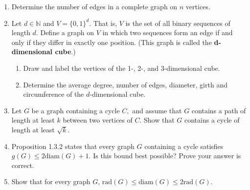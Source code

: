 \documentclass[12pt]{article}
\renewcommand{\emph}[1]{\textsf{\textbf{#1}}}
\newcommand{\bbN}{\mathbb{N}}
\newcommand{\rad}{\text{rad}}
\newcommand{\diam}{\text{diam}}
\begin{document}
\begin{enumerate}
\item Determine the number of edges in a complete graph on $n$ vertices.
\item Let $d \in \bbN$ and $V=\{0,1\}^d.$ That is, $V$ is the set of all binary sequences of length $d.$ Define a graph on $V$ in which two sequences form an edge if and only if they differ in exactly one position. (This graph is called the \emph{d-dimensional cube}.) 
	\begin{enumerate}
	\item Draw and label the vertices of the 1-, 2-, and 3-dimensional cube.
	\item Determine the average degree, number of edges, diameter, girth and circumference of the $d$-dimensional cube.
	\end{enumerate}
\item  Let $G$ be a graph containing a cycle $C,$ and assume that $G$ contains a path of length at least $k$ between two vertices of $C.$ Show that $G$ contains a cycle of length at least $\sqrt{k}$.
\item Proposition 1.3.2 states that every graph $G$ containing a cycle satisfies $g(G) \leq 2\diam(G) +1.$ Is this bound best possible? Prove your answer is correct.
\item Show that for every graph $G$, $\rad(G) \leq \diam(G) \leq 2\rad(G).$
\end{enumerate}
\end{document}
